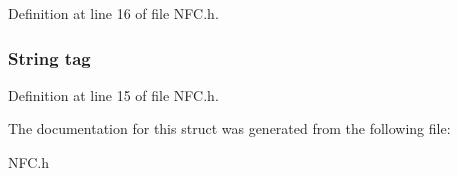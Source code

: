 Definition at line 16 of file N\-F\-C.\-h.

\hypertarget{structNDEF_a3d1b2b9aa7be6b4548fc2e6dbd97103f}{
\subsubsection[{tag}]{\setlength{\rightskip}{0pt plus 5cm}String tag}}\label{structNDEF_a3d1b2b9aa7be6b4548fc2e6dbd97103f}


Definition at line 15 of file N\-F\-C.\-h.



The documentation for this struct was generated from the following file\-:\begin{DoxyCompactItemize}
\item 
N\-F\-C.\-h\end{DoxyCompactItemize}
